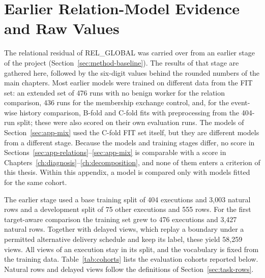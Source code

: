 \chapter{Earlier Relation-Model Evidence and Raw Values}
\label{app:secondary-results}

The relational residual of REL\_GLOBAL was carried over from an earlier
stage of the project (Section~\ref{sec:method-baseline}). The
results of that stage are gathered here, followed by the six-digit
values behind the rounded numbers of the main chapters. Most earlier
models were trained on different data from the FIT set: an extended set of 476
runs with no benign worker for the relation comparison, 436 runs for the
membership exchange control, and, for the event-wise history
comparison, B-fold and C-fold fits with preprocessing from the 404-run
split; these were also scored on their own evaluation runs. The models
of Section~\ref{sec:app-mix} used the C-fold FIT set itself, but they
are different models from a different stage. Because the models and
training stages differ, no score in
Sections~\ref{sec:app-relations}--\ref{sec:app-mix} is
comparable with a score in Chapters~\ref{ch:diagnosis}--\ref{ch:decomposition},
and none of them enters a criterion of this thesis. Within this appendix,
a model is compared only with models fitted for the same cohort.

The earlier stage used a base training split of 404 executions and 3,003
natural rows and a development split of 75 other executions and 555
rows. For the first target-aware comparison the training set grew to 476
executions and 3,427 natural rows. Together with delayed views, which
replay a boundary under a permitted alternative delivery schedule and
keep its label, these yield 58,259 views. All views of an execution stay
in its split, and the vocabulary is fixed from the training data.
Table~\ref{tab:cohorts} lists the evaluation cohorts reported below.
Natural rows and delayed views follow the definitions of
Section~\ref{sec:task-rows}.

